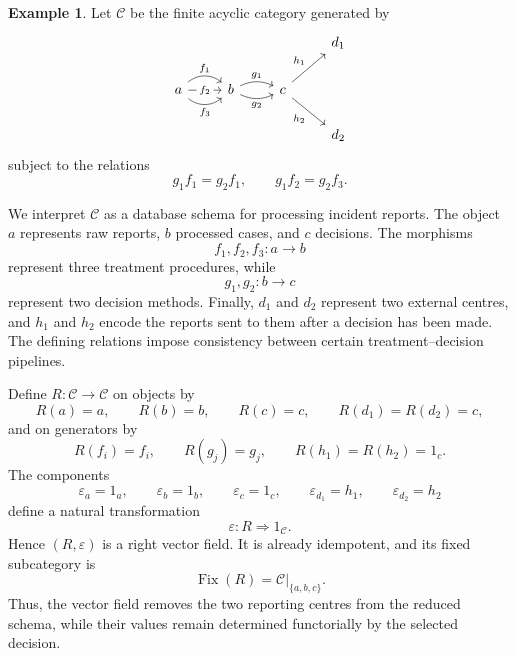 \documentclass[12pt]{amsart}
\theoremstyle{definition}
\newtheorem{example}[teo]{Example}
\theoremstyle{remark}
\numberwithin{figure}{section}%
\newcommand{\CC}{\mathcal{C}}
\begin{document}
\begin{example}\label{ex:incident-database-reduction}
Let \(\CC\) be the finite acyclic category generated by
\[
\begin{tikzcd}
                                                                                               &                                                                   &                                        & d_1 \\
a \arrow[r, "f_1", bend left=40] \arrow[r, "f_2" description] \arrow[r, "f_3"', bend right=40] & b \arrow[r, "g_1", bend left=25] \arrow[r, "g_2"', bend right=25] & c \arrow[ru, "h_1"] \arrow[rd, "h_2"'] &     \\
                                                                                               &                                                                   &                                        & d_2
\end{tikzcd}
\]
subject to the relations
\[
g_1f_1=g_2f_1,
\qquad
g_1f_2=g_2f_3.
\]

We interpret \(\CC\) as a database schema for processing incident
reports. The object \(a\) represents raw reports, \(b\) processed cases,
and \(c\) decisions. The morphisms
\[
f_1,f_2,f_3\colon a\to b
\]
represent three treatment procedures, while
\[
g_1,g_2\colon b\to c
\]
represent two decision methods. Finally, \(d_1\) and \(d_2\) represent
two external centres, and \(h_1\) and \(h_2\) encode the reports sent to
them after a decision has been made. The defining relations impose
consistency between certain treatment--decision pipelines.

Define \(R\colon\CC\to\CC\) on objects by
\[
R(a)=a,\qquad R(b)=b,\qquad R(c)=c,\qquad
R(d_1)=R(d_2)=c,
\]
and on generators by
\[
R(f_i)=f_i,\qquad
R(g_j)=g_j,\qquad
R(h_1)=R(h_2)=1_c.
\]
The components
\[
\varepsilon_a=1_a,
\qquad
\varepsilon_b=1_b,
\qquad
\varepsilon_c=1_c,
\qquad
\varepsilon_{d_1}=h_1,
\qquad
\varepsilon_{d_2}=h_2
\]
define a natural transformation
\[
\varepsilon\colon R\Rightarrow1_\CC.
\]
Hence \((R,\varepsilon)\) is a right vector field. It is already
idempotent, and its fixed subcategory is
\[
\operatorname{Fix}(R)
=
\CC|_{\{a,b,c\}}.
\]
Thus, the vector field removes the two reporting centres from the reduced
schema, while their values remain determined functorially by the selected
decision.


\end{example}
\end{document}
